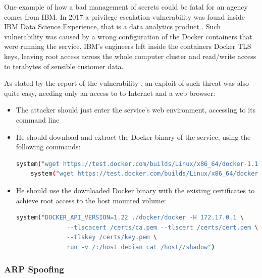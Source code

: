 \documentclass[a4paper,12pt]{article}
\begin{document}
One example of how a bad management of secrets could be fatal for an agency
comes from IBM. In 2017 a privilege escalation vulnerability was found inside
IBM Data Science Experience, that is a data analytics product
\cite{ibm_data_science_experience}. Such vulnerability was caused by a wrong
configuration of the Docker containers that were running the service. IBM's
engineers left inside the containers Docker TLS keys, leaving root access across
the whole computer cluster and read/write access to terabytes of sensible
customer data. \par As stated by the report of the vulnerability
\cite{ibm_data_sciene_report}, an exploit of such threat was also quite easy,
needing only an access to to Internet and a web browser:
\begin{itemize}
  \item The attacker should just enter the service's web environment, accessing
  to its command line
  \item He should download and extract the Docker binary of the service, using
  the following commands: 
  \begin{lstlisting}[language=bash,breaklines]
    system("wget https://test.docker.com/builds/Linux/x86_64/docker-1.13.1-rc1.tgz")
    system("wget https://test.docker.com/builds/Linux/x86_64/docker-1.13.1-rc1.tgz")
  \end{lstlisting}
  \item He should use the downloaded Docker binary with the existing
  certificates to achieve root access to the host mounted volume:
  \begin{lstlisting}[language=bash,breaklines]
    system("DOCKER_API_VERSION=1.22 ./docker/docker -H 172.17.0.1 \
              --tlscacert /certs/ca.pem --tlscert /certs/cert.pem \
              --tlskey /certs/key.pem \
              run -v /:/host debian cat /host//shadow")
  \end{lstlisting}
\end{itemize} 

\subsubsection{ARP Spoofing}
\end{document}
